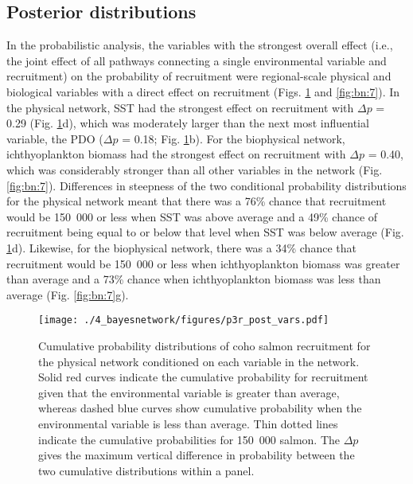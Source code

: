 \subsection{Posterior distributions}

In the probabilistic analysis, the variables with the strongest overall effect
(i.e., the joint effect of all pathways connecting a single environmental
variable and recruitment) on the probability of recruitment were regional-scale
physical and biological variables with a direct effect on recruitment (Figs.
\ref{fig:bn:6} and \ref{fig:bn:7}). In the physical network, SST had the
strongest effect on recruitment with \(\Delta p\) = 0.29 (Fig.
\ref{fig:bn:6}d), which was moderately larger than the next most influential
variable, the PDO (\(\Delta p\) = 0.18; Fig. \ref{fig:bn:6}b). For the
biophysical network, ichthyoplankton biomass had the strongest effect on
recruitment with \(\Delta p\) = 0.40, which was considerably stronger than all
other variables in the network (Fig. \ref{fig:bn:7}). Differences in steepness
of the two conditional probability distributions for the physical network meant
that there was a 76\% chance that recruitment would be 150~000 or less when SST
was above average and a 49\% chance of recruitment being equal to or below that
level when SST was below average (Fig. \ref{fig:bn:6}d). Likewise, for the
biophysical network, there was a 34\% chance that recruitment would be 150~000
or less when ichthyoplankton biomass was greater than average and a 73\% chance
when ichthyoplankton biomass was less than average (Fig. \ref{fig:bn:7}g).

\begin{figure}[htbp]
  \centering \texttt{[image: ./4\_bayesnetwork/figures/p3r\_post\_vars.pdf]}
  \caption[Cumulative probability distributions of coho salmon recruitment for
           the physical network conditioned on each variable in the
           network]{Cumulative probability distributions of coho salmon
           recruitment for the physical network conditioned on each variable in
           the network. Solid red curves indicate the cumulative probability
           for recruitment given that the environmental variable is greater than
           average, whereas dashed blue curves show cumulative probability when
           the environmental variable is less than average. Thin dotted lines
           indicate the cumulative probabilities for 150~000 salmon. The
           \(\Delta p\) gives the maximum vertical difference in probability
           between the two cumulative distributions within a panel.}
  \label{fig:bn:6}
\end{figure}

